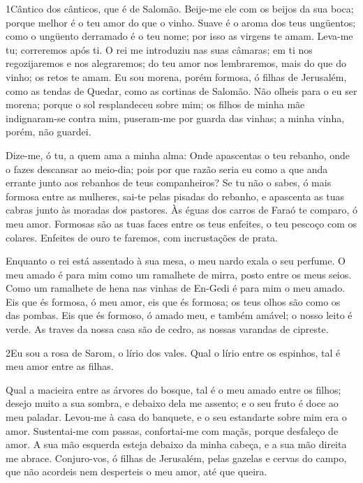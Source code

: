 
\lettrine{1} Cântico dos cânticos, que é de Salomão.
 Beije-me ele com os beijos da sua boca; porque
melhor é o teu amor do que o vinho. Suave é o aroma dos teus
ungüentos; como o ungüento derramado é o teu nome; por isso as
virgens te amam. Leva-me tu; correremos após ti. O rei me
introduziu nas suas câmaras; em ti nos regozijaremos e nos
alegraremos; do teu amor nos lembraremos, mais do que do vinho; os
retos te amam. Eu sou morena, porém formosa, ó filhas de
Jerusalém, como as tendas de Quedar, como as cortinas de Salomão.
Não olheis para o eu ser morena; porque o sol resplandeceu sobre
mim; os filhos de minha mãe indignaram-se contra mim, puseram-me por
guarda das vinhas; a minha vinha, porém, não guardei.

Dize-me, ó tu, a quem ama a minha alma: Onde apascentas o teu
rebanho, onde o fazes descansar ao meio-dia; pois por que razão
seria eu como a que anda errante junto aos rebanhos de teus
companheiros? Se tu não o sabes, ó mais formosa entre as
mulheres, sai-te pelas pisadas do rebanho, e apascenta as tuas
cabras junto às moradas dos pastores. Às éguas dos carros de
Faraó te comparo, ó meu amor. Formosas são as tuas faces
entre os teus enfeites, o teu pescoço com os colares.
Enfeites de ouro te faremos, com incrustações de prata.

Enquanto o rei está assentado à sua mesa, o meu nardo exala o seu
perfume. O meu amado é para mim como um ramalhete de mirra,
posto entre os meus seios. Como um ramalhete de hena nas
vinhas de En-Gedi é para mim o meu amado. Eis que és formosa,
ó meu amor, eis que és formosa; os teus olhos são como os das
pombas. Eis que és formoso, ó amado meu, e também amável; o
nosso leito é verde. As traves da nossa casa são de cedro, as
nossas varandas de cipreste.

\medskip

\lettrine{2} Eu sou a rosa de Sarom, o lírio dos vales.
Qual o lírio entre os espinhos, tal é meu amor entre as filhas.

Qual a macieira entre as árvores do bosque, tal é o meu amado
entre os filhos; desejo muito a sua sombra, e debaixo dela me
assento; e o seu fruto é doce ao meu paladar. Levou-me à casa do
banquete, e o seu estandarte sobre mim era o amor. Sustentai-me
com passas, confortai-me com maçãs, porque desfaleço de amor. A
sua mão esquerda esteja debaixo da minha cabeça, e a sua mão direita
me abrace. Conjuro-vos, ó filhas de Jerusalém, pelas gazelas e
cervas do campo, que não acordeis nem desperteis o meu amor, até que
queira.

